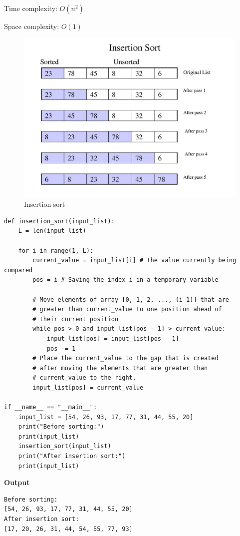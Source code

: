 \documentclass[a4paper,11pt]{book}
\begin{document}
\noindent Time complexity: $O(n^2)$

\noindent Space complexity: $O(1)$

\begin{figure}[ht]
	\centering
	\includegraphics[scale=1.2]{code/sort/pic/picinsertion.jpg}
	\caption{Insertion sort}
\end{figure}

\newpage
\begin{lstlisting}
def insertion_sort(input_list):
    L = len(input_list)
    
    for i in range(1, L):
        current_value = input_list[i] # The value currently being compared
        pos = i # Saving the index i in a temporary variable
        
        # Move elements of array [0, 1, 2, ..., (i-1)] that are 
        # greater than current_value to one position ahead of 
        # their current position
        while pos > 0 and input_list[pos - 1] > current_value:
            input_list[pos] = input_list[pos - 1]
            pos -= 1
        # Place the current_value to the gap that is created 
        # after moving the elements that are greater than 
        # current_value to the right.
        input_list[pos] = current_value

if __name__ == "__main__": 
    input_list = [54, 26, 93, 17, 77, 31, 44, 55, 20]
    print("Before sorting:")
    print(input_list)
    insertion_sort(input_list)
    print("After insertion sort:")
    print(input_list)
\end{lstlisting}
\textbf{Output}
\begin{lstlisting}
Before sorting:
[54, 26, 93, 17, 77, 31, 44, 55, 20]
After insertion sort:
[17, 20, 26, 31, 44, 54, 55, 77, 93]
\end{lstlisting}
\end{document}
